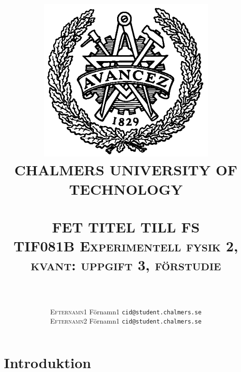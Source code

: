 \documentclass{article}
\title{
\includegraphics[scale=0.2]{fig/Chalmers_logo.png}\\[0.3cm]
\textsc{\Large CHALMERS UNIVERSITY OF TECHNOLOGY}\\[0.5cm] 
\HRule\\
\huge \textsc{FET TITEL TILL FS}\\ \vspace*{0.3cm}
\normalsize{\textsc{TIF081B Experimentell fysik 2, kvant: uppgift 3, förstudie }}\\\HRule\\\vspace{0.5cm} \author{\textsc{Efternamn1} Förnamn1 \texttt{cid@student.chalmers.se}\\ \textsc{Efternamn2} Förnamn1 \texttt{cid@student.chalmers.se}}}
\begin{document}
\maketitle
\section{Introduktion}

%
\end{document}

